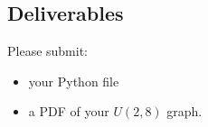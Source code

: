 \begin{fullwidth}
\section{Deliverables}

Please submit:

\begin{itemize}
\item your Python file
\item a PDF of your $U(2,8)$ graph.
\end{itemize}

\end{fullwidth}
